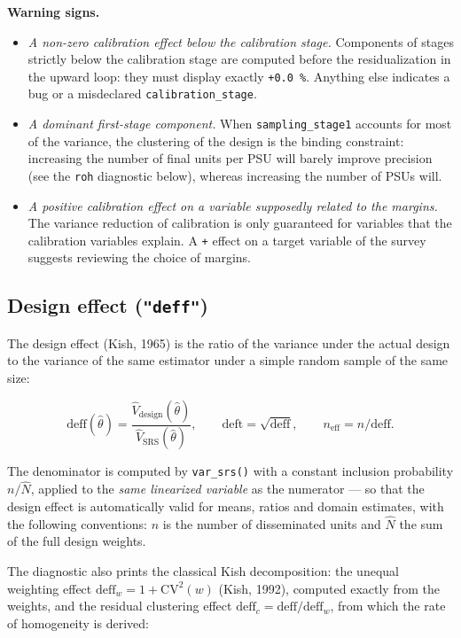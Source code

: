 \documentclass[
]{article}
\providecommand{\tightlist}{%
  \setlength{\itemsep}{0pt}\setlength{\parskip}{0pt}}
\begin{document}
\textbf{Warning signs.}

\begin{itemize}
\tightlist
\item
  \emph{A non-zero calibration effect below the calibration stage.}
  Components of stages strictly below the calibration stage are computed
  before the residualization in the upward loop: they must display
  exactly \texttt{+0.0\ \%}. Anything else indicates a bug or a
  misdeclared \texttt{calibration\_stage}.
\item
  \emph{A dominant first-stage component.} When
  \texttt{sampling\_stage1} accounts for most of the variance, the
  clustering of the design is the binding constraint: increasing the
  number of final units per PSU will barely improve precision (see the
  \texttt{roh} diagnostic below), whereas increasing the number of PSUs
  will.
\item
  \emph{A positive calibration effect on a variable supposedly related
  to the margins.} The variance reduction of calibration is only
  guaranteed for variables that the calibration variables explain. A
  \texttt{+} effect on a target variable of the survey suggests
  reviewing the choice of margins.
\end{itemize}

\subsection{\texorpdfstring{Design effect
(\texttt{"deff"})}{Design effect ("deff")}}\label{design-effect-deff}

The design effect (Kish, 1965) is the ratio of the variance under the
actual design to the variance of the same estimator under a simple
random sample of the same size:

\[\mathrm{deff}(\hat\theta) = \frac{\hat V_{\text{design}}(\hat\theta)}
{\hat V_{\text{SRS}}(\hat\theta)},
\qquad
\mathrm{deft} = \sqrt{\mathrm{deff}},
\qquad
n_{\text{eff}} = n / \mathrm{deff}.\]

The denominator is computed by \texttt{var\_srs()} with a constant
inclusion probability \(n/\hat N\), applied to the \emph{same linearized
variable} as the numerator --- so that the design effect is
automatically valid for means, ratios and domain estimates, with the
following conventions: \(n\) is the number of disseminated units and
\(\hat N\) the sum of the full design weights.

The diagnostic also prints the classical Kish decomposition: the unequal
weighting effect \(\mathrm{deff}_w = 1 + \mathrm{CV}^2(w)\) (Kish,
1992), computed exactly from the weights, and the residual clustering
effect \(\mathrm{deff}_c = \mathrm{deff} / \mathrm{deff}_w\), from which
the rate of homogeneity is derived:
\end{document}
